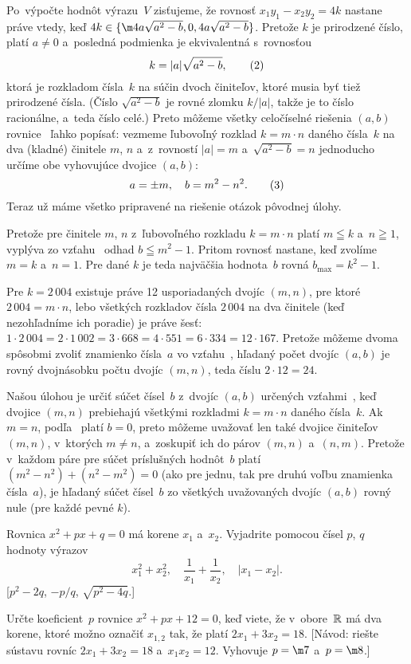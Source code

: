{Po~výpočte hodnôt výrazu~$V$ zisťujeme, že rovnosť
$x_1y_1-x_2y_2=4k$ nastane práve vtedy, keď
$4k\in\{\m4a\sqrt{a^2-b}, 0, 4a\sqrt{a^2-b}\}$. Pretože $k$ je
prirodzené číslo, platí $a\ne0$ a~posledná podmienka je ekvivalentná
s~rovnosťou
$$
k=|a|\sqrt{a^2-b},           \tag2
$$
ktorá je rozkladom čísla~$k$ na súčin dvoch
činiteľov, ktoré musia byť tiež prirodzené čísla. (Číslo
$\sqrt{a^2-b}$
je rovné zlomku $k/|a|$, takže je to číslo racionálne, a~teda
číslo celé.) Preto môžeme všetky celočíselné riešenia $(a,b)$
rovnice~ ľahko popísať: vezmeme ľubovoľný rozklad $k=m\cdot n$
daného čísla~$k$ na dva (kladné) činitele $m$, $n$  
a~z~rovností $|a|=m$ a~$\sqrt{a^2-b}=n$ jednoducho určíme obe vyhovujúce
dvojice $(a,b)$:
$$
a=\pm m,\quad b=m^2-n^2.
\tag3
$$
Teraz už máme všetko pripravené na riešenie otázok pôvodnej úlohy.

Pretože pre činitele $m$, $n$ z~ľubovoľného
rozkladu $k=m\cdot n$ platí $m\leqq k$ a~$n\geqq 1$, vyplýva zo
vzťahu~ odhad $b\leqq m^2-1$. Pritom rovnosť nastane, keď
zvolíme $m=k$ a~$n=1$. Pre dané $k$ je teda najväčšia hodnota~$b$
rovná $b_{\max}=k^2-1$.

Pre $k=2\,004$ existuje práve 12 usporiadaných dvojíc
$(m,n)$, pre ktoré $2\,004=m\cdot n$, lebo všetkých rozkladov čísla
$2\,004$ na dva činitele (keď nezohľadníme ich poradie) je práve
šesť: $1\cdot2\,004=2\cdot1\,002=3\cdot668=4\cdot551=
6\cdot334=12\cdot167$. Pretože môžeme dvoma spôsobmi zvoliť znamienko
čísla~$a$ vo vzťahu~, hľadaný počet dvojíc $(a,b)$ je rovný
dvojnásobku počtu dvojíc $(m,n)$, teda číslu $2\cdot12=24$.

Našou úlohou je určiť súčet čísel~$b$ z~dvojíc
$(a,b)$ určených vzťahmi~, keď dvojice $(m,n)$ prebiehajú
všetkými rozkladmi $k=m\cdot n$ daného čísla~$k$. Ak $m=n$,
podľa~ platí $b=0$, preto môžeme uvažovať len také dvojice
činiteľov $(m,n)$, v~ktorých $m\ne n$, a~zoskupiť ich do párov
$(m,n)$ a~$(n,m)$. Pretože v~každom páre pre súčet príslušných
hodnôt~$b$ platí $(m^2-n^2)+(n^2-m^2)=0$ (ako pre jednu, tak pre
druhú voľbu znamienka čísla~$a$), je hľadaný súčet čísel~$b$ zo
všetkých uvažovaných dvojíc $(a,b)$ rovný nule (pre každé pevné
$k$).

Rovnica $x^2+px+q=0$ má korene $x_1$ a~$x_2$. Vyjadrite
pomocou čísel $p$, $q$ hodnoty výrazov
$$
x_1^2+x_2^2,\quad\frac{1}{x_1}+\frac{1}{x_2},\quad |x_1-x_2|.
$$
[$p^2-2q$, ${- p/q}$, $\sqrt{p^2-4q}$.]

Určte koeficient~$p$ rovnice $x^2+px+12=0$, keď viete, že
v~obore~$\Bbb R$ má dva korene, ktoré možno označiť $x_{1,2}$ tak,
že platí $2x_1+3x_2=18$. [Návod: riešte sústavu rovníc
$2x_1+3x_2=18$ a~$x_1x_2=12$. Vyhovuje $p=\m7$ a~$p=\m8$.]
}

